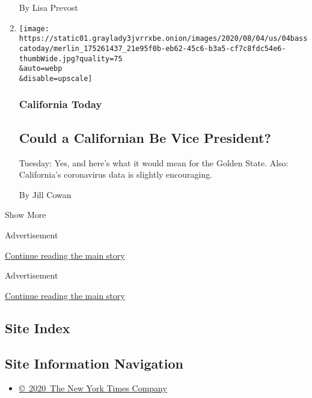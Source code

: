 \begin{enumerate}
  By Lisa Prevost
\item
  \href{/2020/08/04/us/biden-vp-karen-bass-kamala-harris.html}{}

  \texttt{[image: https://static01.graylady3jvrrxbe.onion/images/2020/08/04/us/04basscatoday/merlin\_175261437\_21e95f0b-eb62-45c6-b3a5-cf7c8fdc54e6-thumbWide.jpg?quality=75\\\&auto=webp\\\&disable=upscale]}

  \hypertarget{california-today}{%
  \subsubsection{California Today}\label{california-today}}

  \hypertarget{could-a-californian-be-vice-president}{%
  \subsection{Could a Californian Be Vice
  President?}\label{could-a-californian-be-vice-president}}

  Tuesday: Yes, and here's what it would mean for the Golden State.
  Also: California's coronavirus data is slightly encouraging.

  By Jill Cowan
\end{enumerate}

Show More

Advertisement

\protect\hyperlink{after-mid2}{Continue reading the main story}

Advertisement

\protect\hyperlink{after-mktg}{Continue reading the main story}

\hypertarget{site-index}{%
\subsection{Site Index}\label{site-index}}

\hypertarget{site-information-navigation}{%
\subsection{Site Information
Navigation}\label{site-information-navigation}}

\begin{itemize}
\tightlist
\item
  \href{https://help.nytimes3xbfgragh.onion/hc/en-us/articles/115014792127-Copyright-notice}{©~2020~The
  New York Times Company}
\end{itemize}

